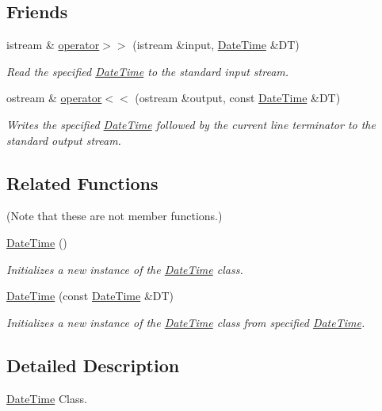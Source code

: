 \subsection*{Friends}
\begin{DoxyCompactItemize}
\item 
istream \& \hyperlink{class_date_time_a2a7b5a6ce0f12397e2fc83060106cfbd}{operator$>$$>$} (istream \&input, \hyperlink{class_date_time}{Date\-Time} \&D\-T)
\begin{DoxyCompactList}\small\item\em Read the specified \hyperlink{class_date_time}{Date\-Time} to the standard input stream. \end{DoxyCompactList}\item 
ostream \& \hyperlink{class_date_time_aaffa9ef1d2a2e41e2e2765dbcbfdcdae}{operator$<$$<$} (ostream \&output, const \hyperlink{class_date_time}{Date\-Time} \&D\-T)
\begin{DoxyCompactList}\small\item\em Writes the specified \hyperlink{class_date_time}{Date\-Time} followed by the current line terminator to the standard output stream. \end{DoxyCompactList}\end{DoxyCompactItemize}
\subsection*{Related Functions}
(Note that these are not member functions.) \begin{DoxyCompactItemize}
\item 
\hyperlink{class_date_time_a3ccfb87f7a2e9683b91964e32d907161}{Date\-Time} ()
\begin{DoxyCompactList}\small\item\em Initializes a new instance of the \hyperlink{class_date_time}{Date\-Time} class. \end{DoxyCompactList}\item 
\hyperlink{class_date_time_a68fb98c071f90a98561c3b33737f9600}{Date\-Time} (const \hyperlink{class_date_time}{Date\-Time} \&D\-T)
\begin{DoxyCompactList}\small\item\em Initializes a new instance of the \hyperlink{class_date_time}{Date\-Time} class from specified \hyperlink{class_date_time}{Date\-Time}. \end{DoxyCompactList}\end{DoxyCompactItemize}


\subsection{Detailed Description}
\hyperlink{class_date_time}{Date\-Time} Class. 

